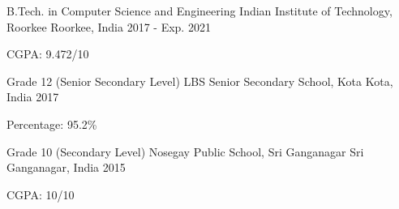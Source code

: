

\begin{cventries}

  \cventry
    {B.Tech. in Computer Science and Engineering} %
    {Indian Institute of Technology, Roorkee} %
    {Roorkee, India} %
    {2017 - Exp. 2021} %
    {
      \begin{cvitems} %
        \item {CGPA: 9.472/10}
      \end{cvitems}
    }

  \cventry
    {Grade 12 (Senior Secondary Level)} %
    {LBS Senior Secondary School, Kota} %
    {Kota, India} %
    {2017} %
    {
      \begin{cvitems} %
        \item {Percentage: 95.2\%}
      \end{cvitems}
    }

  \cventry
    {Grade 10 (Secondary Level)} %
    {Nosegay Public School, Sri Ganganagar} %
    {Sri Ganganagar, India} %
    {2015} %
    {
      \begin{cvitems} %
        \item {CGPA: 10/10}
      \end{cvitems}
    }

\end{cventries}
